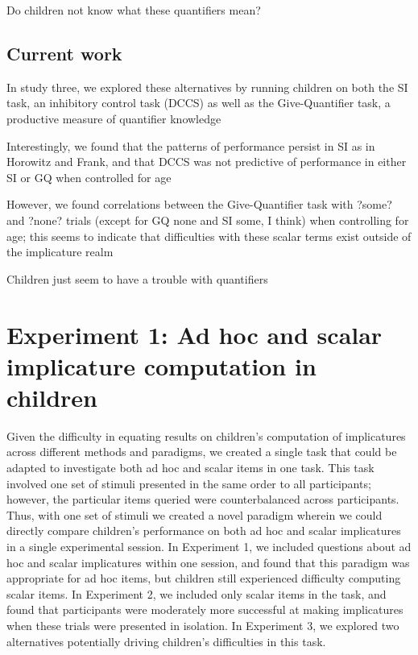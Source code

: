 \documentclass[man]{apa2}
\begin{document}
Do children not know what these quantifiers mean?

\subsection{Current work}

In study three, we explored these alternatives by running children on both the SI task, an inhibitory control task (DCCS) as well as the Give-Quantifier task, a productive measure of quantifier knowledge

Interestingly, we found that the patterns of performance persist in SI as in Horowitz and Frank, and that DCCS was not predictive of performance in either SI or GQ when controlled for age

However, we found correlations between the Give-Quantifier task with ?some? and ?none? trials (except for GQ none and SI some, I think) when controlling for age; this seems to indicate that difficulties with these scalar terms exist outside of the implicature realm

Children just seem to have a trouble with quantifiers


\section{Experiment 1: Ad hoc and scalar implicature computation in children}

Given the difficulty in equating results on children's computation of implicatures across different methods and paradigms, we created a single task that could be adapted to investigate both ad hoc and scalar items in one task. This task involved one set of stimuli presented in the same order to all participants; however, the particular items queried were counterbalanced across participants. Thus, with one set of stimuli we created a novel paradigm wherein we could directly compare children's performance on both ad hoc and scalar implicatures in a single experimental session. In Experiment 1, we included questions about ad hoc and scalar implicatures within one session, and found that this paradigm was appropriate for ad hoc items, but children still experienced difficulty computing scalar items. In Experiment 2, we included only scalar items in the task, and found that participants were moderately more successful at making implicatures when these trials were presented in isolation. In Experiment 3, we explored two alternatives potentially driving children's difficulties in this task.  
\end{document}
